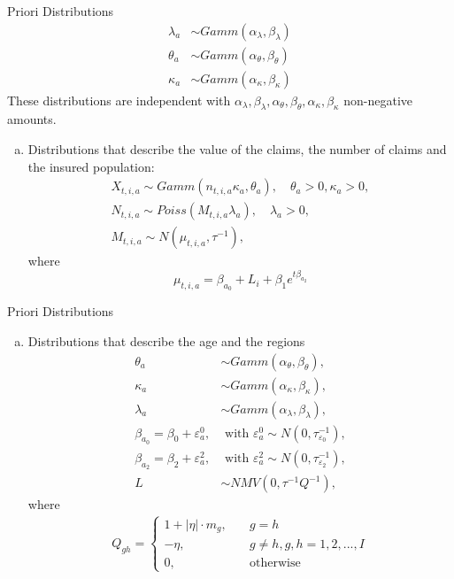 \documentclass[10pt]{beamer} %
\begin{document}
\begin{frame}{Priori Distributions}
\begin{align*}
\lambda_{a}&\sim Gamm(\alpha_{\lambda},\beta_{\lambda})\\
\theta_{a}&\sim Gamm(\alpha_{\theta},\beta_{\theta})\\
\kappa_{a}&\sim Gamm(\alpha_{	\kappa},\beta_{	\kappa})
\end{align*}
These distributions are independent with $\alpha_{\lambda},\beta_{\lambda},\alpha_{\theta},\beta_{\theta},\alpha_{	\kappa},\beta_{	\kappa}$ non-negative amounts.
\begin{enumerate}[a)]
	\item Distributions that describe the value of the claims, the number of claims and the insured population:
	\begin{align*}
	X_{t,i,a}\sim Gamm(n_{t,i,a}\kappa_{a},\theta_a),\quad \theta_a>0,\kappa_a>0,\\
	N_{t,i,a}\sim Poiss(M_{t,i,a}\lambda_a),\quad \lambda_a>0,\\
	M_{t,i,a}\sim N(\mu_{t,i,a},\tau^{-1}),
	\end{align*}
	where $$\mu_{t,i,a}=\beta_{a_0}+L_i+\beta_1e^{t\beta_{a_2}}$$
	
\end{enumerate}

\end{frame}
\begin{frame}{Priori Distributions}
\begin{enumerate}[b)]
   \item Distributions that describe the age and the regions
	\begin{align*}
	\theta_{a}&\sim Gamm(\alpha_{\theta},\beta_{\theta}),\\
	\kappa_{a}&\sim Gamm(\alpha_{	\kappa},\beta_{	\kappa}),\\
	\lambda_{a}&\sim Gamm(\alpha_{\lambda},\beta_{\lambda}),\\
	\beta_{a_0}=\beta_0+\varepsilon_a^0,&\textrm{ with }\varepsilon_a^0\sim N(0,\tau_{\varepsilon_0}^{-1}),\\
	\beta_{a_2}=\beta_2+\varepsilon_a^2,& \textrm{ with }\varepsilon_a^2\sim N(0,\tau_{\varepsilon_2}^{-1}),\\
	L&\sim NMV(0,\tau^{-1}Q^{-1}),
	\end{align*}
	where 
	\begin{align*}
	Q_{gh}=\left\{\begin{matrix}
	1+|\eta|\cdot m_g, \quad &g=h\\
	-\eta, \quad &g\neq h,g,h=1,2,...,I\\
	0,\quad &\textrm{otherwise}
	\end{matrix}\right.
	\end{align*}
	    
\end{enumerate}
    
\end{frame}
\end{document}
